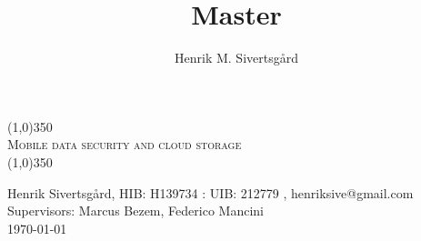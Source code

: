 \documentclass[11pt]{report}
\title{Master}
\author{Henrik M. Sivertsgård}
\begin{document}
  \begin{titlepage}
    \begin{center}
      \line(1,0){350}
      \\[1cm]
      \textsc{\LARGE Mobile data security and cloud storage}
      \\[1cm]
      \line(1,0){350}
    \end{center}
    Henrik Sivertsgård, HIB: H139734 : UIB: 212779 , henriksive@gmail.com
    \\[0.2cm]
    Supervisors: Marcus Bezem, Federico Mancini
    \\[0.2cm]
    \today
  \end{titlepage}

  \newpage
  \tableofcontents

  \listoffigures

  \listoftables

  \lstlistoflistings




  
  
  
  
  
  


  \printbibliography
\end{document}
